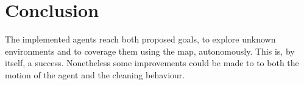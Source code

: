 \documentclass[]{article}
\begin{document}
\section{Conclusion}

The implemented agents reach both proposed goals, to explore unknown environments and to coverage them using the map, autonomously. This is, by itself, a success. Nonetheless some improvements could be made to to both the motion of the agent and the cleaning behaviour.

\printbibliography
\end{document}
